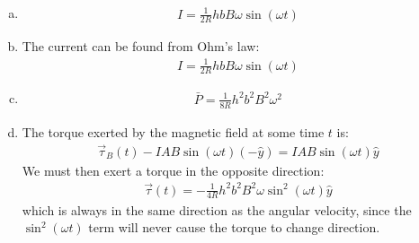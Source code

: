 \begin{finalanswer}
\begin{enumerate}[(a)]
\item 
\begin{align*}
I=\frac{1}{2R}hbB\omega\sin(\omega t)
\end{align*}
\item The current can be found from Ohm's law:
\begin{align*}
I=\frac{1}{2R}hbB\omega\sin(\omega t)
\end{align*}
\item \begin{align*}
\bar P=\frac{1}{8R}h^2b^2B^2\omega^2
\end{align*}
\item The torque exerted by the magnetic field at some time $t$ is:
\begin{align*}
\vec \tau_B(t)-IAB\sin(\omega t)(-\hat y)=IAB\sin(\omega t)\hat y
\end{align*} 
We must then exert a torque in the opposite direction:
\begin{align*}
\vec\tau(t)=-\frac{1}{4R}h^2b^2B^2\omega\sin^2(\omega t)\hat y
\end{align*}
which is always in the same direction as the angular velocity, since the $\sin^2(\omega t)$ term will never cause the torque to change direction. 
\end{enumerate}
\end{finalanswer}
